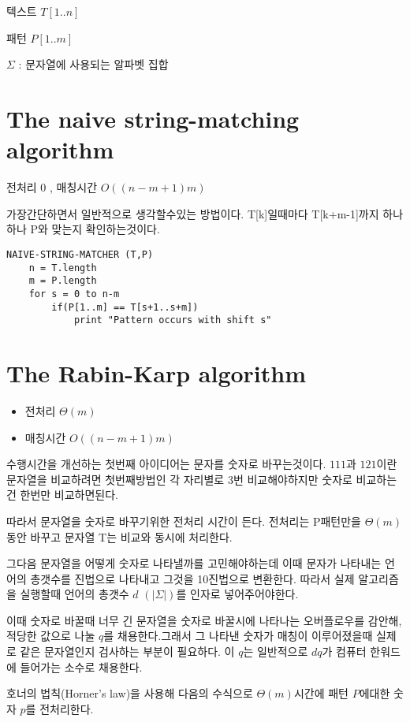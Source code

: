 

텍스트 $T[1..n]$ 

패턴 $P[1..m]$

$\Sigma$ : 문자열에 사용되는 알파벳 집합 

\section{The naive string-matching algorithm}

전처리 0 , 매칭시간 $O((n-m+1)m)$

가장간단하면서 일반적으로 생각할수있는 방법이다.
T[k]일때마다 T[k+m-1]까지 하나하나 P와 맞는지 확인하는것이다.

\begin{lstlisting}[syle = CStyle]
NAIVE-STRING-MATCHER (T,P)
    n = T.length
    m = P.length
    for s = 0 to n-m
        if(P[1..m] == T[s+1..s+m])
            print "Pattern occurs with shift s"
\end{lstlisting}



\section{The Rabin-Karp algorithm}
\begin{itemize}
    \item 전처리 $\Theta(m)$
    \item 매칭시간 $O((n-m+1)m)$
\end{itemize}

수행시간을 개선하는 첫번째 아이디어는 문자를 숫자로 바꾸는것이다.
$111$과 $121$이란 문자열을 비교하려면 첫번째방법인 각 자리별로 3번 비교해야하지만 숫자로 비교하는건 한번만 비교하면된다.

따라서 문자열을 숫자로 바꾸기위한 전처리 시간이 든다.
전처리는 P패턴만을 $\Theta(m)$동안 바꾸고 문자열 T는 비교와 동시에 처리한다.

그다음 문자열을 어떻게 숫자로 나타낼까를 고민해야하는데 이때 문자가 나타내는 언어의 총갯수를 진법으로 나타내고 그것을 10진법으로 변환한다. 따라서 실제 알고리즘을 실행할때 언어의 총갯수 $d$ $(|\Sigma|)$를 인자로 넣어주어야한다.

이때 숫자로 바꿀때 너무 긴 문자열을 숫자로 바꿀시에 나타나는 오버플로우를 감안해, 적당한 값으로 나눌 $q$를 채용한다.그래서 그 나타낸 숫자가 매칭이 이루어졌을때 실제로 같은 문자열인지 검사하는 부분이 필요하다. 이 $q$는 일반적으로 $dq$가 컴퓨터 한워드에 들어가는 소수로 채용한다.

호너의 법칙(Horner's law)을 사용해 다음의 수식으로 $\Theta(m)$시간에 패턴 $P$에대한 숫자 $p$를 전처리한다.

